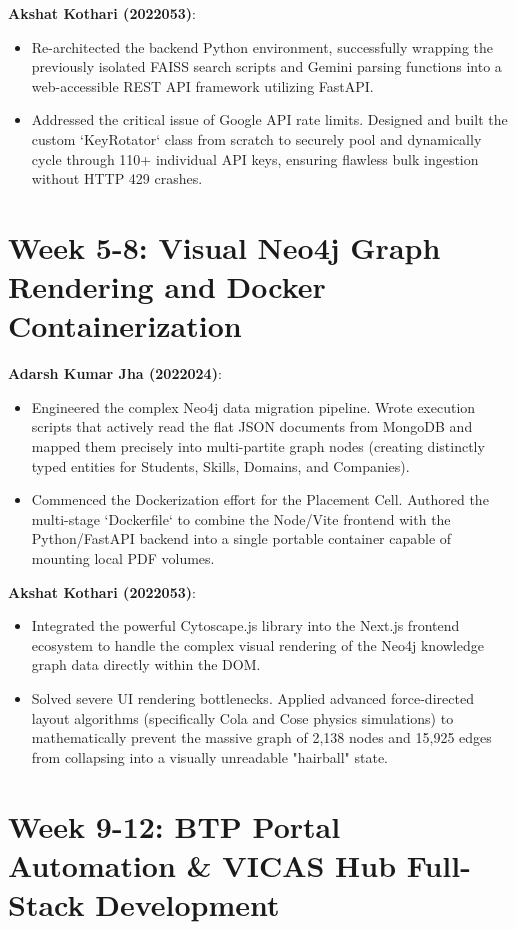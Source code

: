 \documentclass[12pt,a4paper]{report}
\begin{document}
\textbf{Akshat Kothari (2022053)}:
\begin{itemize}
    \item Re-architected the backend Python environment, successfully wrapping the previously isolated FAISS search scripts and Gemini parsing functions into a web-accessible REST API framework utilizing FastAPI.
    \item Addressed the critical issue of Google API rate limits. Designed and built the custom `KeyRotator` class from scratch to securely pool and dynamically cycle through 110+ individual API keys, ensuring flawless bulk ingestion without HTTP 429 crashes.
\end{itemize}

\section{Week 5-8: Visual Neo4j Graph Rendering and Docker Containerization}

\textbf{Adarsh Kumar Jha (2022024)}:
\begin{itemize}
    \item Engineered the complex Neo4j data migration pipeline. Wrote execution scripts that actively read the flat JSON documents from MongoDB and mapped them precisely into multi-partite graph nodes (creating distinctly typed entities for Students, Skills, Domains, and Companies).
    \item Commenced the Dockerization effort for the Placement Cell. Authored the multi-stage `Dockerfile` to combine the Node/Vite frontend with the Python/FastAPI backend into a single portable container capable of mounting local PDF volumes.
\end{itemize}

\textbf{Akshat Kothari (2022053)}:
\begin{itemize}
    \item Integrated the powerful Cytoscape.js library into the Next.js frontend ecosystem to handle the complex visual rendering of the Neo4j knowledge graph data directly within the DOM.
    \item Solved severe UI rendering bottlenecks. Applied advanced force-directed layout algorithms (specifically Cola and Cose physics simulations) to mathematically prevent the massive graph of 2,138 nodes and 15,925 edges from collapsing into a visually unreadable "hairball" state.
\end{itemize}

\section{Week 9-12: BTP Portal Automation \& VICAS Hub Full-Stack Development}
\end{document}
